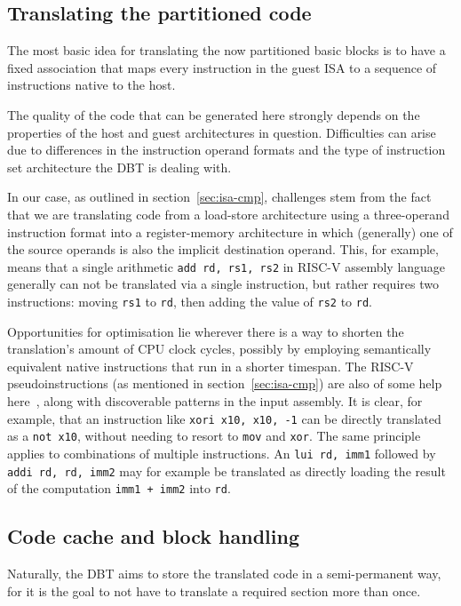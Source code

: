 \subsection{Translating the partitioned code}
The most basic idea for translating the now partitioned basic blocks is to have a fixed association that maps every instruction in the guest ISA to a sequence of instructions native to the host.

The quality of the code that can be generated here strongly depends on the properties of the host and guest architectures in question.
Difficulties can arise due to differences in the instruction operand formats and the type of instruction set architecture the DBT is dealing with.

In our case, as outlined in section~\ref{sec:isa-cmp}, challenges stem from the fact that we are translating code from a load-store architecture using a three-operand instruction format into a register-memory architecture in which (generally) one of the source operands is also the implicit destination operand.
This, for example, means that a single arithmetic \texttt{add rd, rs1, rs2} in RISC-V assembly language generally can not be translated via a single instruction, but rather requires two instructions: moving \texttt{rs1} to \texttt{rd}, then adding the value of \texttt{rs2} to \texttt{rd}.

Opportunities for optimisation lie wherever there is a way to shorten the translation's amount of CPU clock cycles, possibly by employing semantically equivalent native instructions that run in a shorter timespan.
The RISC-V pseudoinstructions (as mentioned in section~\ref{sec:isa-cmp}) are also of some help here~\cite[S. 139]{riscvspec}, along with discoverable patterns in the input assembly.
It is clear, for example, that an instruction like \texttt{xori x10, x10, -1} can be directly translated as a \texttt{not x10}, without needing to resort to \texttt{mov} and \texttt{xor}.
The same principle applies to combinations of multiple instructions.
An \texttt{lui rd, imm1} followed by \texttt{addi rd, rd, imm2} may for example be translated as directly loading the result of the computation \texttt{imm1 + imm2} into \texttt{rd}.

\subsection{Code cache and block handling}
Naturally, the DBT aims to store the translated code in a semi-permanent way, for it is the goal to not have to translate a required section more than once.

